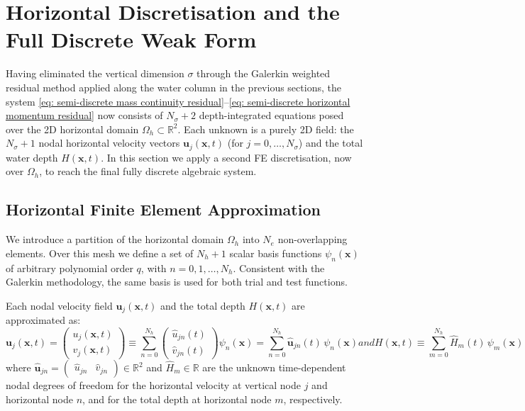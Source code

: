 \documentclass{article}
\newcommand{\Ns}{N_\sigma}
\newcommand{\uj}{\mathbf{u}_j}
\newcommand{\Nh}{N_h}
\newcommand{\sumNhn}{\sum_{n=0}^{\Nh}}
\newcommand{\sumNhm}{\sum_{m=0}^{\Nh}}
\newcommand{\uhjn}{\hat{\mathbf{u}}_{jn}}
\newcommand{\Hm}{\hat{H}_m}
\begin{document}
\section{Horizontal Discretisation and the Full Discrete Weak Form}
 
Having eliminated the vertical dimension $\sigma$ through the Galerkin weighted residual method applied along the water column in the previous sections, the system \eqref{eq: semi-discrete mass continuity residual}--\eqref{eq: semi-discrete horizontal momentum residual} now consists of $\Ns+2$ depth-integrated equations posed over the 2D horizontal domain $\Omega_h \subset \mathbb{R}^2$.
Each unknown is a purely 2D field: the $\Ns+1$ nodal horizontal velocity vectors $\uj(\mathbf{x},t)$ (for $j=0,\ldots,\Ns$) and the total water depth $H(\mathbf{x},t)$.
In this section we apply a second FE discretisation, now over $\Omega_h$, to reach the final fully discrete algebraic system.


 
\subsection{Horizontal Finite Element Approximation}
 
We introduce a partition of the horizontal domain $\Omega_h$ into $N_e$ non-overlapping elements.
Over this mesh we define a set of $\Nh+1$ scalar basis functions $\psi_n(\mathbf{x})$ of arbitrary polynomial order $q$, with $n=0,1,\ldots,\Nh$.
Consistent with the Galerkin methodology, the same basis is used for both trial and test functions.
 
Each nodal velocity field $\uj(\mathbf{x},t)$ and the total depth $H(\mathbf{x},t)$ are approximated as:
\begin{subequations}
    \begin{equation}
    \uj(\mathbf{x},t) = \begin{pmatrix} u_j(\mathbf{x}, t) \\ v_j(\mathbf{x}, t) \end{pmatrix} \equiv  \sumNhn \begin{pmatrix} \hat{u}_{jn}(t) \\ \hat{v}_{jn}(t) \end{pmatrix} \psi_n(\mathbf{x}) = \sumNhn \uhjn(t) \,\psi_n(\mathbf{x})
    \label{eq: horizontal velocity FE approximation}
\end{equation}
and
\begin{equation}
    H(\mathbf{x},t) \equiv \sumNhm \Hm(t) \,\psi_m(\mathbf{x})
    \label{eq: horizontal H FE approximation}
\end{equation}
\label{eq: horizontal FE approximations}
\end{subequations}
where $\uhjn = \begin{pmatrix} \hat{u}_{jn} & \hat{v}_{jn} \end{pmatrix} \in \mathbb{R}^2$ and $\Hm \in \mathbb{R}$ are the unknown time-dependent nodal degrees of freedom for the horizontal velocity at vertical node $j$ and horizontal node $n$, and for the total depth at horizontal node $m$, respectively.
 
\end{document}
